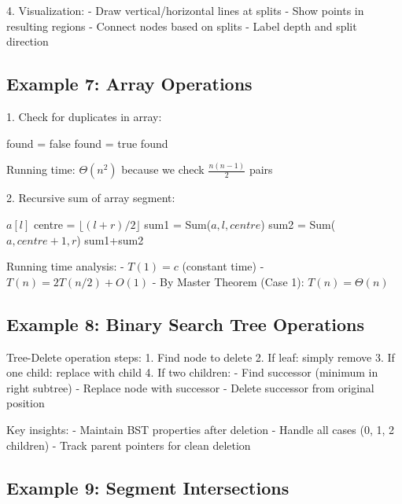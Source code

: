 4. Visualization:
   - Draw vertical/horizontal lines at splits
   - Show points in resulting regions
   - Connect nodes based on splits
   - Label depth and split direction

\subsection{Example 7: Array Operations}

1. Check for duplicates in array:
\begin{algorithm}
\begin{algorithmic}[1]
\State found = false
            \State found = true
        \EndIf
    \EndFor
\EndFor
\State \Return found
\EndProcedure
\end{algorithmic}
\end{algorithm}
Running time: $\Theta(n^2)$ because we check $\frac{n(n-1)}{2}$ pairs

2. Recursive sum of array segment:
\begin{algorithm}
\begin{algorithmic}[1]
    \State \Return $a[l]$
\Else
    \State centre = $\lfloor(l+r)/2\rfloor$
    \State sum1 = Sum($a,l,centre$)
    \State sum2 = Sum($a,centre+1,r$)
    \State \Return sum1+sum2
\EndIf
\EndProcedure
\end{algorithmic}
\end{algorithm}

Running time analysis:
- $T(1) = c$ (constant time)
- $T(n) = 2T(n/2) + O(1)$
- By Master Theorem (Case 1): $T(n) = \Theta(n)$

\subsection{Example 8: Binary Search Tree Operations}

Tree-Delete operation steps:
1. Find node to delete
2. If leaf: simply remove
3. If one child: replace with child
4. If two children:
   - Find successor (minimum in right subtree)
   - Replace node with successor
   - Delete successor from original position

Key insights:
- Maintain BST properties after deletion
- Handle all cases (0, 1, 2 children)
- Track parent pointers for clean deletion

\subsection{Example 9: Segment Intersections}

